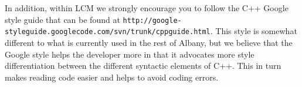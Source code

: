\documentclass[10pt,a4paper]{article} \usepackage[utf8]{inputenc}
\begin{document}
In addition, within LCM we strongly encourage you to follow the C++
Google style guide that can be found at
\verb+http://google-styleguide.googlecode.com/svn/trunk/cppguide.html+.
This style is somewhat different to what is currently used in the rest
of Albany, but we believe that the Google style helps the developer
more in that it advocates more style differentiation between the
different syntactic elements of C++. This in turn makes reading code
easier and helps to avoid coding errors.
\end{document}
